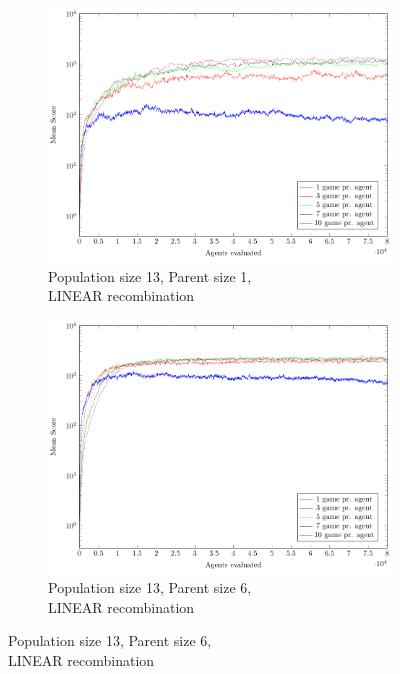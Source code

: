 \begin{figure}
\begin{subfigure}[b]{0.49\textwidth}
    \end{subfigure}
    \begin{subfigure}[b]{0.49\textwidth}
    	\caption{Population size 13, Parent size 1,\\LINEAR recombination}
        \includegraphics[width=\textwidth]{data/cma_population_offspring/13x_split/linear_l13_o1/mean/PlotFile.pdf}
    \end{subfigure}
    \begin{subfigure}[b]{0.49\textwidth}
    	\caption{Population size 13, Parent size 6,\\LINEAR recombination}
        \includegraphics[width=\textwidth]{data/cma_population_offspring/13x_split/linear_l13_o6/mean/PlotFile.pdf}
    \end{subfigure}

\end{figure}
